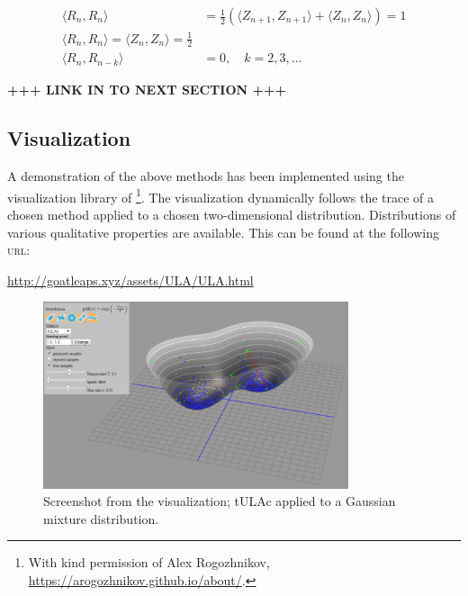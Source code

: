 \begin{align*}
    \langle R_n,R_n\rangle  &= \frac{1}{2} \left( \langle Z_{n+1},Z_{n+1}\rangle +\langle Z_{n},Z_{n}\rangle\right) =1\\
    \langle R_n,R_n\rangle = \langle Z_n,Z_n\rangle = \frac{1}{2}\\
    \langle R_n,R_{n-k} \rangle &= 0,   \quad k=2,3,\dots 
\end{align*}

{\bf +++ LINK IN TO NEXT SECTION +++ }







\subsection{Visualization}
A demonstration of the above methods has been implemented using the visualization library of \cite{rogozhnikov2016hmc}\footnote{With kind permission of Alex Rogozhnikov, \url{https://arogozhnikov.github.io/about/}.}. The visualization dynamically follows the trace of a chosen method applied to a chosen two-dimensional distribution. Distributions of various qualitative properties are available. This can be found at the following \textsc{url}: \\
   \centerline{ \url{http://goatleaps.xyz/assets/ULA/ULA.html}}

\begin{figure}[H]
\centering
  \begin{minipage}[b]{0.8\textwidth}
  \centering
    \includegraphics[width=0.8\textwidth]{Figures/ulavis.PNG}
    \caption{Screenshot from the visualization;  tULAc applied to a Gaussian mixture distribution.}
  \end{minipage}
\end{figure}

